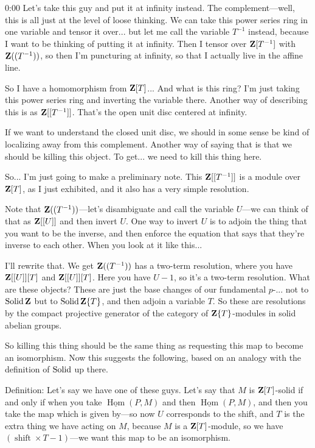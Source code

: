 \begin{unfinished}{0:00}
Let's take this guy and put it at infinity instead. The complement---well, this is all just at the level of loose thinking. We can take this power series ring in one variable and tensor it over... but let me call the variable $T^{-1}$ instead, because I want to be thinking of putting it at infinity. Then I tensor over $\mathbf Z[T^{-1}]$ with $\mathbf Z((T^{-1}))$, so then I'm puncturing at infinity, so that I actually live in the affine line.

So I have a homomorphism from $\mathbf Z[T]$... And what is this ring? I'm just taking this power series ring and inverting the variable there. Another way of describing this is as $\mathbf Z[[T^{-1}]]$. That's the open unit disc centered at infinity.

If we want to understand the closed unit disc, we should in some sense be kind of localizing away from this complement. Another way of saying that is that we should be killing this object. To get... we need to kill this thing here.

So... I'm just going to make a preliminary note. This $\mathbf Z[[T^{-1}]]$ is a module over $\mathbf Z[T]$, as I just exhibited, and it also has a very simple resolution.

Note that $\mathbf Z((T^{-1}))$---let's disambiguate and call the variable $U$---we can think of that as $\mathbf Z[[U]]$ and then invert $U$. One way to invert $U$ is to adjoin the thing that you want to be the inverse, and then enforce the equation that says that they're inverse to each other. When you look at it like this...

I'll rewrite that. We get $\mathbf Z((T^{-1}))$ has a two-term resolution, where you have $\mathbf Z[[U]][T]$ and $\mathbf Z[[U]][T]$. Here you have $U-1$, so it's a two-term resolution. What are these objects? These are just the base changes of our fundamental $p$-... not to $\operatorname{Solid} \mathbf Z$ but to $\operatorname{Solid} \mathbf Z \{T\}$, and then adjoin a variable $T$. So these are resolutions by the compact projective generator of the category of $\mathbf Z\{T\}$-modules in solid abelian groups.

So killing this thing should be the same thing as requesting this map to become an isomorphism. Now this suggests the following, based on an analogy with the definition of $\mathrm{Solid}$ up there.

Definition: Let's say we have one of these guys. Let's say that $M$ is $\mathbf Z[T]$-solid if and only if when you take $\underline{\operatorname{Hom}}(P, M)$ and then $\underline{\operatorname{Hom}}(P, M)$, and then you take the map which is given by---so now $U$ corresponds to the shift, and $T$ is the extra thing we have acting on $M$, because $M$ is a $\mathbf Z[T]$-module, so we have $(\operatorname{shift} \times T - 1)$---we want this map to be an isomorphism.


\end{unfinished}

